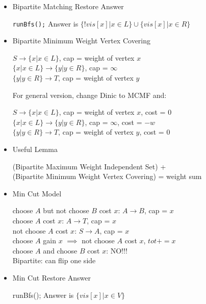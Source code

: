 \begin{itemize}
	\itemsep-0.3em
	\item Bipartite Matching Restore Answer

	\texttt{runBfs();} Answer is $\{!vis[x] | x \in L\} \cup \{vis[x] | x \in R\}$
	
	\item Bipartite Minimum Weight Vertex Covering

	$S \to \{x | x \in L\}$, cap = weight of vertex $x$\\
	$\{x | x \in L\} \to \{y | y \in R\}$, cap = $\infty$\\
	$\{y | y \in R\} \to T$, cap = weight of vertex $y$
	
	For general version, change Dinic to MCMF and:
	
	$S \to \{x | x \in L\}$, cap = weight of vertex $x$, cost = $0$\\
	$\{x | x \in L\} \to \{y | y \in R\}$, cap = $\infty$, cost = $-w$\\
	$\{y | y \in R\} \to T$, cap = weight of vertex $y$, cost = $0$
	
	\item Useful Lemma

	(Bipartite Maximum Weight Independent Set) + \\
	(Bipartite Minimum Weight Vertex Covering) = weight sum

	\item Min Cut Model

	choose $A$ but not choose $B$ cost $x$: $A \to B$, cap = $x$\\
	choose $A$ cost $x$: $A \to T$, cap = $x$\\
	not choose $A$ cost $x$: $S \to A$, cap = $x$\\
	choose $A$ gain $x$ $\implies$ not choose $A$ cost $x$, $tot += x$\\
	choose $A$ and choose $B$ cost $x$: NO!!!\\
	Bipartite: can flip one side
	
	\item Min Cut Restore Answer
	
	runBfs(); Answer is $\{vis[x] | x \in V\}$
\end{itemize}